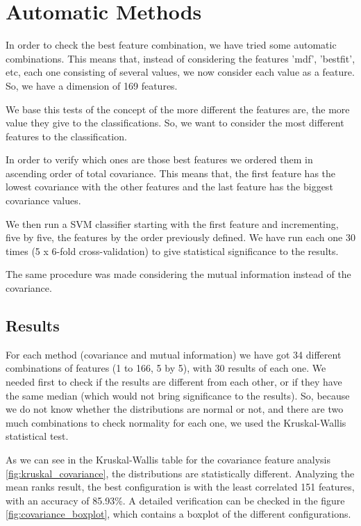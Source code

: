 \documentclass[12pt,a4paper]{report}
\begin{document}
				
			\section{Automatic Methods}
			
			
			In order to check the best feature combination, we have tried some automatic combinations. This means that, instead of considering the features 'mdf', 'bestfit', etc, each one consisting of several values, we now consider each value as a feature. So, we have a dimension of 169 features.
			
			We base this tests of the concept of the more different the features are, the more value they give to the classifications. So, we want to consider the most different features to the classification.
			
			In order to verify which ones are those best features we ordered them in ascending order of total covariance. This means that, the first feature has the lowest covariance with the other features and the last feature has the biggest covariance values.
			
			We then run a SVM classifier starting with the first feature and incrementing, five by five, the features by the order previously defined. We have run each one 30 times (5 x 6-fold cross-validation) to give statistical significance to the results.
			
			
			The same procedure was made considering the mutual information instead of the covariance.
				
				
				\subsection{Results}
				
			For each method (covariance and mutual information) we have got 34 different combinations of features (1 to 166, 5 by 5), with 30 results of each one. We needed first to check if the results are different from each other, or if they have the same median (which would not bring significance to the results). So, because we do not know whether the distributions are normal or not, and there are two much combinations to check normality for each one, we used the Kruskal-Wallis statistical test.
			
			As we can see in the Kruskal-Wallis table for the covariance feature analysis \ref{fig:kruskal_covariance}, the distributions are statistically different. Analyzing the mean ranks result, the best configuration is with the least correlated 151 features, with an accuracy of 85.93\%. A detailed verification can be checked in the figure \ref{fig:covariance_boxplot}, which contains a boxplot of the different configurations. 
			
\end{document}
